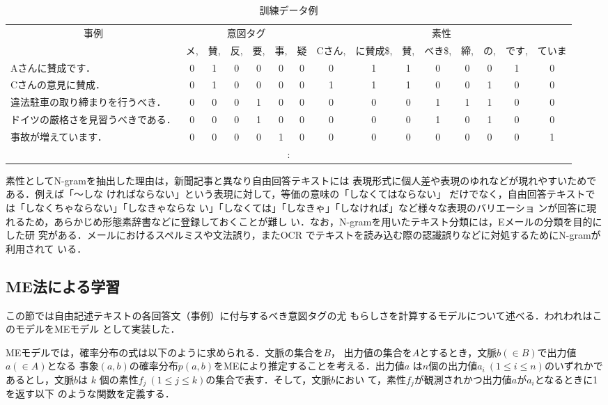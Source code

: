\begin{table}[t]
\begin{center}
\leavevmode
\caption{訓練データ例}
\label{tab:training_data}
\begin{tabular}{l|c@{}c@{}c@{}c@{}c@{}c|c@{}c@{}c@{}c@{}c@{}c@{}c@{}c}
\multicolumn{1}{c|}{事例}
&\multicolumn{6}{c|}{意図タグ}
&\multicolumn{8}{c}{素性}\\
&メ, &賛, &反, &要, &事, &疑
&Cさん, &に賛成\$, &賛, &べき\$, &締, &の, &です, &ていま \\ \hline \hline
Aさんに賛成です．
&0 &1 &0 &0 &0 &0
&0 &1 &1 &0 &0 &0 &1 &0 \\ \hline
Cさんの意見に賛成．
&0 &1 &0 &0 &0 &0
&1 &1 &1 &0 &0 &1 &0 &0 \\ \hline
違法駐車の取り締まりを行うべき．
&0 &0 &0 &1 &0 &0
&0 &0 &0 &1 &1 &1 &0 &0 \\ \hline
ドイツの厳格さを見習うべきである．
&0 &0 &0 &1 &0 &0
&0 &0 &0 &1 &0 &1 &0 &0 \\ \hline
事故が増えています．
&0 &0 &0 &0 &1 &0
&0 &0 &0 &0 &0 &0 &0 &1 \\
\multicolumn{15}{c}{:}
\end{tabular}
\end{center}
\end{table}


素性としてN-gramを抽出した理由は，新聞記事と異なり自由回答テキストには
表現形式に個人差や表現のゆれなどが現れやすいためである．例えば「〜しな
ければならない」という表現に対して，等価の意味の「しなくてはならない」
だけでなく，自由回答テキストでは「しなくちゃならない」「しなきゃならな
い」「しなくては」「しなきゃ」「しなければ」など様々な表現のバリエーショ
ンが回答に現れるため，あらかじめ形態素辞書などに登録しておくことが難し
い．なお，N-gramを用いたテキスト分類には，Eメールの分類を目的にした研
究がある\cite{cavnar:94}．メールにおけるスペルミスや文法誤り，またOCR 
でテキストを読み込む際の認識誤りなどに対処するためにN-gramが利用されて
いる．

\subsection{ME法による学習}
\label{ssec:learning}
この節では自由記述テキストの各回答文（事例）に付与するべき意図タグの尤
もらしさを計算するモデルについて述べる．われわれはこのモデルをMEモデル
として実装した．

MEモデルでは，確率分布の式は以下のように求められる．文脈の集合を$B$，
出力値の集合を$A$とするとき，文脈$b (\in B)$で出力値$a (\in A)$となる
事象$(a,b)$の確率分布$p(a,b)$をMEにより推定することを考える．出力値$a$
は$n$個の出力値$a_{i}~(1 \le i \le n)$のいずれかであるとし，文脈$b$は
$k$ 個の素性$f_{j}~(1 \le j \le k)$の集合で表す．そして，文脈$b$におい
て，素性$f_{j}$が観測されかつ出力値$a$が$a_{i}$となるときに1を返す以下
のような関数を定義する．


